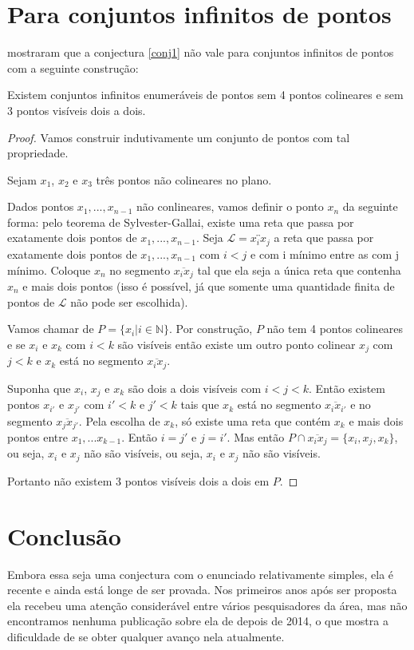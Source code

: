 \section{Para conjuntos infinitos de pontos}
\cite{infinity} mostraram que a conjectura \ref{conj1} não vale para conjuntos infinitos de pontos com a seguinte construção:

\begin{teorema}
    Existem conjuntos infinitos enumeráveis de pontos sem 4 pontos colineares e sem 3 pontos visíveis dois a dois.
\end{teorema}
\begin{proof}
    Vamos construir indutivamente um conjunto de pontos com tal propriedade.

    Sejam $x_1$, $x_2$ e $x_3$ três pontos não colineares no plano.

    Dados pontos $x_1,...,x_{n-1}$ não conlineares, vamos definir o ponto $x_n$ da seguinte forma: pelo teorema de Sylvester-Gallai, existe uma reta que passa por exatamente dois pontos de $x_1,...,x_{n-1}$. Seja $\mathcal L=\overleftrightarrow{x_ix_j}$ a reta que passa por exatamente dois pontos de $x_1,...,x_{n-1}$ com $i<j$ e com i mínimo entre as com j mínimo. Coloque $x_n$ no segmento $\overline{x_ix_j}$ tal que ela seja a única reta que contenha $x_n$ e mais dois pontos (isso é possível, já que somente uma quantidade finita de pontos de $\mathcal L$ não pode ser escolhida).

    Vamos chamar de $P = \{x_i|i\in \mathbb N\}$. Por construção, $P$ não tem 4 pontos colineares e se $x_i$ e $x_k$ com $i<k$ são visíveis então existe um outro ponto colinear $x_j$ com $j<k$ e $x_k$ está no segmento $\overline{x_ix_j}$.

    Suponha que $x_i$, $x_j$ e $x_k$ são dois a dois visíveis com $i<j<k$. Então existem pontos $x_{i'}$ e $x_{j'}$ com $i'<k$ e $j'<k$ tais que $x_k$ está no segmento $\overline{x_ix_{i'}}$ e no segmento $\overline{x_jx_{j'}}$. Pela escolha de $x_k$, só existe uma reta que contém $x_k$ e mais dois pontos entre $x_1,...x_{k-1}$. Então $i=j'$ e $j=i'$. Mas então $P\cap\overline{x_ix_j}=\{x_i,x_j,x_k\}$, ou seja, $x_i$ e $x_j$ não são visíveis, ou seja, $x_i$ e $x_j$ não são visíveis.

    Portanto não existem 3 pontos visíveis dois a dois em $P$.

\end{proof}

\section{Conclusão}
Embora essa seja uma conjectura com o enunciado relativamente simples, ela é recente e ainda está longe de ser provada. Nos primeiros anos após ser proposta ela recebeu uma atenção considerável entre vários pesquisadores da área, mas não encontramos nenhuma publicação sobre ela de depois de 2014, o que mostra a dificuldade de se obter qualquer avanço nela atualmente.

